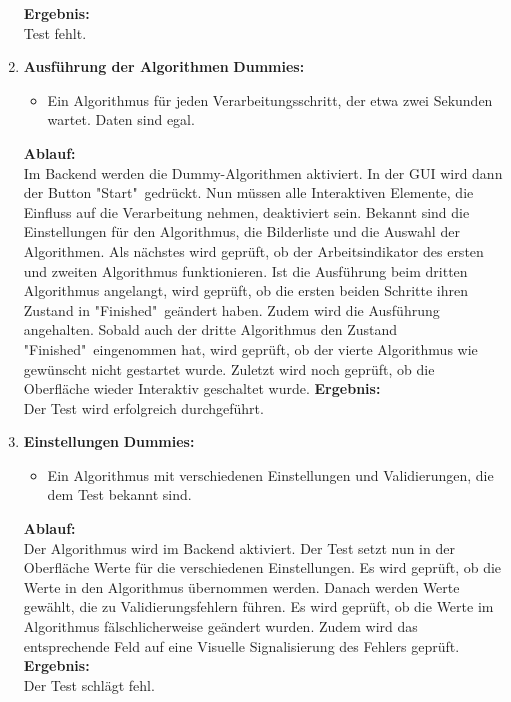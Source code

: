 \begin{enumerate}[align=left, leftmargin=4em, label={\textbf{\textbackslash T3.\arabic*\textbackslash}} ]
	\subitem\textbf{Ergebnis:}\\
	Test fehlt.
	\\\item \textbf{Ausführung der Algorithmen}
	\subitem \textbf{Dummies:}\begin{itemize}
		\item Ein Algorithmus für jeden Verarbeitungsschritt, der etwa zwei Sekunden wartet. Daten sind egal.
	\end{itemize}
	\subitem \textbf{Ablauf:}\\ Im Backend werden die Dummy-Algorithmen aktiviert. In der GUI wird dann der Button "{}Start" gedrückt. Nun müssen alle Interaktiven Elemente, die Einfluss auf die Verarbeitung nehmen, deaktiviert sein. Bekannt sind die Einstellungen für den Algorithmus, die Bilderliste und die Auswahl der Algorithmen. Als nächstes wird geprüft, ob der Arbeitsindikator des ersten und zweiten Algorithmus funktionieren. Ist die Ausführung beim dritten Algorithmus angelangt, wird geprüft, ob die ersten beiden Schritte ihren Zustand in "{}Finished" geändert haben. Zudem wird die Ausführung angehalten. Sobald auch der dritte Algorithmus den Zustand "{}Finished" eingenommen hat, wird geprüft, ob der vierte Algorithmus wie gewünscht nicht gestartet wurde. Zuletzt wird noch geprüft, ob die Oberfläche wieder Interaktiv geschaltet wurde.
	\subitem\textbf{Ergebnis:}\\
	Der Test wird erfolgreich durchgeführt.
	\\\item \textbf{Einstellungen}
	\subitem \textbf{Dummies:}\begin{itemize}
		\item Ein Algorithmus mit verschiedenen Einstellungen und Validierungen, die dem Test bekannt sind.
	\end{itemize}
	\subitem \textbf{Ablauf:}\\ Der Algorithmus wird im Backend aktiviert. Der Test setzt nun in der Oberfläche Werte für die verschiedenen Einstellungen. Es wird geprüft, ob die Werte in den Algorithmus übernommen werden. Danach werden Werte gewählt, die zu Validierungsfehlern führen. Es wird geprüft, ob die Werte im Algorithmus fälschlicherweise geändert wurden. Zudem wird das entsprechende Feld auf eine Visuelle Signalisierung des Fehlers geprüft.
	\subitem\textbf{Ergebnis:}\\
	Der Test schlägt fehl.
\end{enumerate}